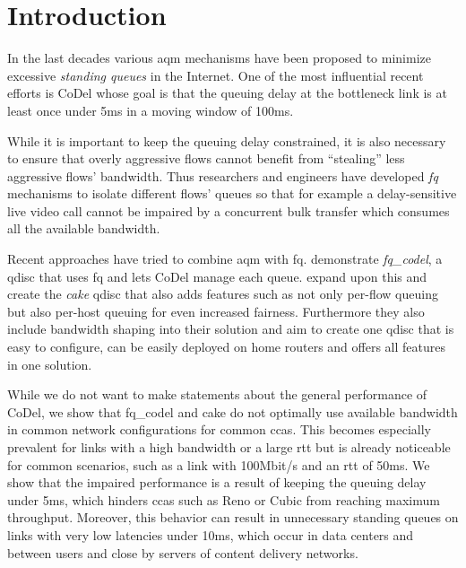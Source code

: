 \documentclass[sigconf, 10pt, letterpaper,dvipsnames\ifx\removeHeaders\tempYes ,nonacm\fi]{acmart}
\newcommand{\codel}{CoDel}
\begin{document}
\maketitle

\section{Introduction}

In the last decades various \gls{aqm} mechanisms have been proposed to minimize excessive \textit{standing queues} in the Internet. One of the most influential recent efforts is \codel{} \cite{nichols_controlling_2012} whose goal is that the queuing delay at the bottleneck link is at least once under 5\;ms in a moving window of 100\;ms. 

While it is important to keep the queuing delay constrained, it is also necessary to ensure that overly aggressive flows cannot benefit from ``stealing'' less aggressive flows' bandwidth. Thus researchers and engineers have developed \textit{\gls{fq}} mechanisms \cite{shreedhar_efficient_1996,dumazet_pkt_sched:_2013} to isolate different flows' queues so that for example a delay-sensitive live video call cannot be impaired by a concurrent bulk transfer which consumes all the available bandwidth. 

Recent approaches have tried to combine \gls{aqm} with \gls{fq}. \cite{taht_flow_2018} demonstrate \textit{fq\_codel}, a \gls{qdisc} that uses \gls{fq} and lets \codel{} manage each queue. \cite{hoiland-jorgensen_piece_2018} expand upon this and create the \textit{cake} \gls{qdisc} that also adds features such as not only per-flow queuing but also per-host queuing for even increased fairness. Furthermore they also include bandwidth shaping into their solution and aim to create one \gls{qdisc} that is easy to configure, can be easily deployed on home routers and offers all features in one solution. 

While we do not want to make statements about the general performance of \codel{}, we show that fq\_codel and cake do not optimally use available bandwidth in common network configurations for common \glspl{cca}. This becomes especially prevalent for links with a high bandwidth or a large \gls{rtt} but is already noticeable for common scenarios, such as a link with 100\;Mbit/s and an \gls{rtt} of 50\;ms. We show that the impaired performance is a result of keeping the queuing delay under 5\;ms, which hinders \glspl{cca} such as Reno or Cubic from reaching maximum throughput. Moreover, this behavior can result in unnecessary standing queues on links with very low latencies under 10\;ms, which occur in data centers and between users and close by servers of content delivery networks. 
\end{document}
